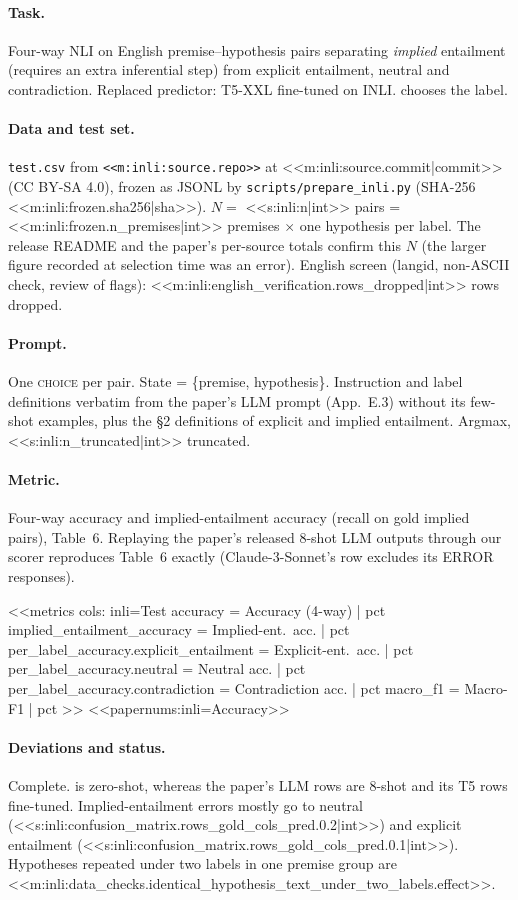 \paragraph{Task.} Four-way NLI on English premise--hypothesis pairs separating \emph{implied} entailment (requires an
extra inferential step) from explicit entailment, neutral and contradiction. Replaced predictor: T5-XXL fine-tuned on
INLI. \jev{} chooses the label.

\paragraph{Data and test set.} \texttt{test.csv} from \texttt{<<m:inli:source.repo>>} at
<<m:inli:source.commit|commit>> (CC BY-SA 4.0), frozen as JSONL by \texttt{scripts/\allowbreak{}prepare\_inli.py} (SHA-256 <<m:inli:frozen.sha256|sha>>).
$N=$ <<s:inli:n|int>> pairs = <<m:inli:frozen.n_premises|int>> premises $\times$ one hypothesis per label. The
release README and the paper's per-source totals confirm this $N$ (the larger figure recorded at selection time was an error). English
screen (langid, non-ASCII check, review of flags): <<m:inli:english_verification.rows_dropped|int>> rows dropped.

\paragraph{Prompt.} One \textsc{choice} per pair. State = \{premise, hypothesis\}. Instruction and label definitions
verbatim from the paper's LLM prompt (App.~E.3) without its few-shot examples, plus the \S2 definitions of explicit and
implied entailment. Argmax, <<s:inli:n_truncated|int>> truncated.

\paragraph{Metric.} Four-way accuracy and implied-entailment accuracy (recall on gold implied pairs), Table~6.
Replaying the paper's released 8-shot LLM outputs through our scorer reproduces Table~6 exactly (Claude-3-Sonnet's
row excludes its ERROR responses).

<<metrics
cols: inli=Test
accuracy = Accuracy (4-way) | pct
implied_entailment_accuracy = Implied-ent.\ acc. | pct
per_label_accuracy.explicit_entailment = Explicit-ent.\ acc. | pct
per_label_accuracy.neutral = Neutral acc. | pct
per_label_accuracy.contradiction = Contradiction acc. | pct
macro_f1 = Macro-F1 | pct
>>
<<papernums:inli=Accuracy>>

\paragraph{Deviations and status.} Complete. \jev{} is zero-shot, whereas the paper's LLM rows are 8-shot and its T5
rows fine-tuned. Implied-entailment errors mostly go to neutral (<<s:inli:confusion_matrix.rows_gold_cols_pred.0.2|int>>)
and explicit entailment (<<s:inli:confusion_matrix.rows_gold_cols_pred.0.1|int>>).
Hypotheses repeated under two labels in one premise group are
<<m:inli:data_checks.identical_hypothesis_text_under_two_labels.effect>>.

